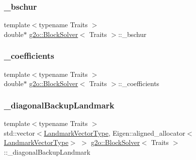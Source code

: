 \subsubsection{\texorpdfstring{\+\_\+bschur}{\_bschur}}
{\footnotesize\ttfamily template$<$typename Traits $>$ \\
double$\ast$ \mbox{\hyperlink{classg2o_1_1_block_solver}{g2o\+::\+Block\+Solver}}$<$ Traits $>$\+::\+\_\+bschur\hspace{0.3cm}{\ttfamily [protected]}}

\mbox{\label{classg2o_1_1_block_solver_a416f480d4b27d7f8962ae7ae363f2e32}} 
\subsubsection{\texorpdfstring{\+\_\+coefficients}{\_coefficients}}
{\footnotesize\ttfamily template$<$typename Traits $>$ \\
double$\ast$ \mbox{\hyperlink{classg2o_1_1_block_solver}{g2o\+::\+Block\+Solver}}$<$ Traits $>$\+::\+\_\+coefficients\hspace{0.3cm}{\ttfamily [protected]}}

\mbox{\label{classg2o_1_1_block_solver_a3bc5b19faa2c45e2c04a6743b3a083de}} 
\subsubsection{\texorpdfstring{\+\_\+diagonal\+Backup\+Landmark}{\_diagonalBackupLandmark}}
{\footnotesize\ttfamily template$<$typename Traits $>$ \\
std\+::vector$<$\mbox{\hyperlink{classg2o_1_1_block_solver_a19ade5e432f32e46557192ae75074304}{Landmark\+Vector\+Type}}, Eigen\+::aligned\+\_\+allocator$<$\mbox{\hyperlink{classg2o_1_1_block_solver_a19ade5e432f32e46557192ae75074304}{Landmark\+Vector\+Type}}$>$ $>$ \mbox{\hyperlink{classg2o_1_1_block_solver}{g2o\+::\+Block\+Solver}}$<$ Traits $>$\+::\+\_\+diagonal\+Backup\+Landmark\hspace{0.3cm}{\ttfamily [protected]}}

